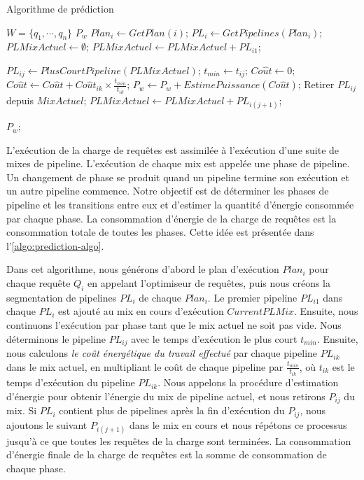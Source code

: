 \begin{algorithm}
\caption{Algorithme de prédiction}
\label{algo:prediction-algo}
\begin{algorithmic}[1]
\Require  $W = \{q_1, \cdots, q_n\}$ 
\Ensure $P_w$ 
    \State $Plan_i \leftarrow GetPlan(i)$;
    \State $PL_i \leftarrow GetPipelines(Plan_i)$;
\EndFor
\State
$PLMixActuel \leftarrow \emptyset$;
    \State $PLMixActuel \leftarrow PLMixActuel + PL_{i1}$;
\EndFor
\State

	\State $PL_{ij} \leftarrow PlusCourtPipeline(PLMixActuel)$;
	\State $t_{min} \leftarrow t_{ij}$;
	\State $Co\hat{u}t \leftarrow 0$;
		\State $Co\hat{u}t \leftarrow Co\hat{u}t + Co\hat{u}t_{ik} \times \frac{t_{min}}{t_{ik}}$;
	\EndFor
	\State $P_w \leftarrow P_w + EstimePuissance(Co\hat{u}t)$;
	\State Retirer $PL_{ij}$ depuis $MixActuel$;
		\State $PLMixActuel \leftarrow PLMixActuel + PL_{i(j+1)}$;
	\EndIf
\EndWhile

\State
\State
\Return $P_w$;
\end{algorithmic}
\end{algorithm}

L'exécution de la charge de requêtes est assimilée à l'exécution d'une suite de mixes de pipeline. L'exécution de chaque mix est appelée une phase de pipeline. Un changement de phase se produit quand un pipeline termine son exécution et un autre pipeline commence. Notre objectif est de déterminer les phases de pipeline et les transitions entre eux et d'estimer la quantité d'énergie consommée par chaque phase. La consommation d'énergie de la charge de requêtes est la consommation totale de toutes les phases. Cette idée est présentée dans l'\ref{algo:prediction-algo}.

Dans cet algorithme, nous générons d'abord le plan d'exécution $Plan_i$ pour chaque requête $Q_i$ en appelant l'optimiseur de requêtes, puis nous créons la segmentation de pipelines $PL_i$ de chaque $Plan_i$. Le premier pipeline $PL_{i1} $ dans chaque $PL_i$ est ajouté au mix en cours d'exécution $CurrentPLMix$. Ensuite, nous continuons l'exécution par phase tant que le mix actuel ne soit pas vide. Nous déterminons le pipeline $PL_{ij} $ avec le temps d'exécution le plus court $t_{min}$. Ensuite, nous calculons \textit{le coût énergétique du travail effectué} par chaque pipeline $PL_{ik} $ dans le mix actuel, en multipliant le coût de chaque pipeline par $\frac{t_{min}}{t_{ik}} $, où $t_{ik}$ est le temps d'exécution du pipeline $PL_{ik}$. Nous appelons la procédure d'estimation d'énergie pour obtenir l'énergie du mix de pipeline actuel, et nous retirons $P_{ij}$ du mix. Si $PL_i$ contient plus de pipelines après la fin d'exécution du $P_{ij}$, nous ajoutons le suivant $P_{i(j+1)}$ dans le mix en cours et nous répétons ce processus jusqu'à ce que toutes les requêtes de la charge sont terminées. La consommation d'énergie finale de la charge de requêtes est la somme de consommation de chaque phase.


